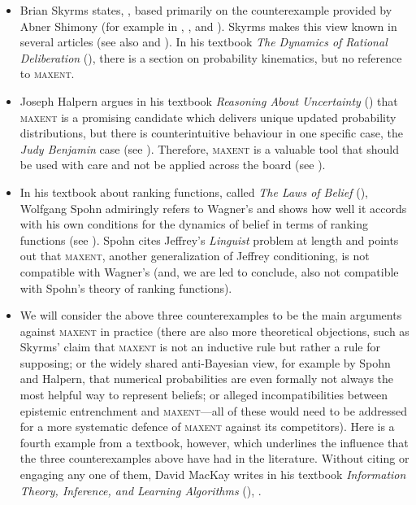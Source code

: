 \documentclass[11pt]{article}
\begin{document}
\begin{itemize}
\item Brian Skyrms states,  , based
  primarily on the counterexample provided by Abner Shimony (for
  example in ,
  , and ). Skyrms
  makes this view known in several articles (see also
   and ). In his
  textbook \emph{The Dynamics of Rational Deliberation}
  (), there is a section on probability
  kinematics, but no reference to \textsc{maxent}.
\item Joseph Halpern argues in his textbook \emph{Reasoning About
    Uncertainty} () that \textsc{maxent} is a
  promising candidate which delivers unique updated probability
  distributions, but there is counterintuitive behaviour in one
  specific case, the \emph{Judy Benjamin} case (see ). Therefore, \textsc{maxent} is a valuable tool that should
  be used with care and not be applied across the board (see
  ).
\item In his textbook about ranking functions, called \emph{The Laws
    of Belief} (), Wolfgang Spohn admiringly
  refers to Wagner's   and shows how well it
  accords with his own conditions for the dynamics of belief in terms
  of ranking functions (see ). Spohn cites
  Jeffrey's \emph{Linguist} problem at length and points out that
  \textsc{maxent}, another generalization of Jeffrey conditioning, is
  not compatible with Wagner's (and, we are led to conclude, also not
  compatible with Spohn's theory of ranking functions).
\item We will consider the above three counterexamples to be the main
  arguments against \textsc{maxent} in practice (there are also more
  theoretical objections, such as Skyrms' claim that \textsc{maxent}
  is not an inductive rule but rather a rule for supposing; or the
  widely shared anti-Bayesian view, for example by Spohn and Halpern,
  that numerical probabilities are even formally not always the most
  helpful way to represent beliefs; or alleged incompatibilities
  between epistemic entrenchment and \textsc{maxent}---all of these
  would need to be addressed for a more systematic defence of
  \textsc{maxent} against its competitors). Here is a fourth example
  from a textbook, however, which underlines the influence that the
  three counterexamples above have had in the literature. Without
  citing or engaging any one of them, David MacKay writes in his
  textbook \emph{Information Theory, Inference, and Learning
    Algorithms} (),  .
\end{itemize}
\end{document}
